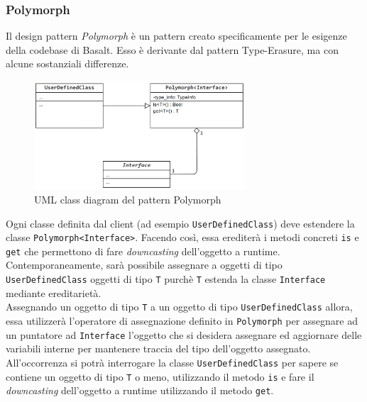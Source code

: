 
\subsubsection{Polymorph}
Il design pattern \textit{Polymorph} è un pattern creato specificamente per le esigenze della codebase di Basalt. Esso 
è derivante dal pattern Type-Erasure, ma con alcune sostanziali differenze. \\

\begin{figure}[H]
    \centering
        \includegraphics[width=0.7\textwidth]{../../Assets/Polymorph.png}
    \caption{UML class diagram del pattern Polymorph}
\end{figure}

Ogni classe definita dal client (ad esempio \texttt{UserDefinedClass}) deve estendere la classe \texttt{Polymorph<Interface>}. 
Facendo così, essa erediterà i metodi concreti \texttt{is} e \texttt{get} che permettono di fare \textit{downcasting}
dell'oggetto a runtime. \\

Contemporaneamente, sarà possibile assegnare a oggetti di tipo \texttt{UserDefinedClass} oggetti di tipo \texttt{T} purchè 
\texttt{T} estenda la classe \texttt{Interface} mediante ereditarietà. \\

Assegnando un oggetto di tipo \texttt{T} a un oggetto di tipo \texttt{UserDefinedClass} allora, essa utilizzerà l'operatore 
di assegnazione definito in \texttt{Polymorph} per assegnare ad un puntatore ad \texttt{Interface} l'oggetto che si desidera assegnare
ed aggiornare delle variabili interne per mantenere traccia del tipo dell'oggetto assegnato. \\

All'occorrenza si potrà interrogare la classe \texttt{UserDefinedClass} per sapere se contiene un oggetto di tipo \texttt{T}
o meno, utilizzando il metodo \texttt{is} e fare il \textit{downcasting} dell'oggetto a runtime utilizzando il metodo \texttt{get}. \\

